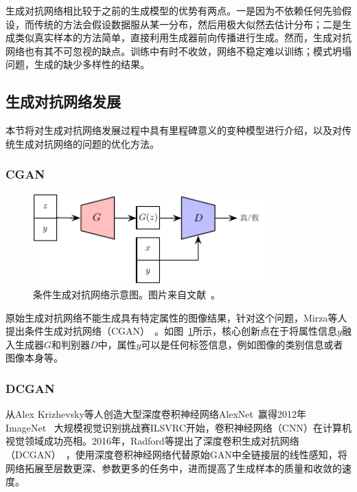 生成对抗网络相比较于之前的生成模型的优势有两点。一是因为不依赖任何先验假设，而传统的方法会假设数据服从某一分布，然后用极大似然去估计分布；二是生成类似真实样本的方法简单，直接利用生成器前向传播进行生成。然而，生成对抗网络也有其不可忽视的缺点。训练中有时不收敛，网络不稳定难以训练；模式坍塌问题，生成的缺少多样性的结果。

\subsection{生成对抗网络发展}
本节将对生成对抗网络发展过程中具有里程碑意义的变种模型进行介绍，以及对传统生成对抗网络的问题的优化方法。

\subsubsection{CGAN}

\begin{figure}[ht]
    \centering
	\includegraphics[width=0.8\textwidth]{figures/CGAN.pdf}
	\caption{条件生成对抗网络示意图。图片来自文献~\cite{mirza2014conditional}。}
	\label{fig:pic_CGAN}
\end{figure}

原始生成对抗网络不能生成具有特定属性的图像结果，针对这个问题，Mirza等人提出条件生成对抗网络（CGAN）~\citep{mirza2014conditional}。如图~\ref{fig:pic_CGAN}所示，核心创新点在于将属性信息$y$融入生成器$G$和判别器$D$中，属性$y$可以是任何标签信息，例如图像的类别信息或者图像本身等。

\subsubsection{DCGAN}
从Alex Krizhevsky等人创造大型深度卷积神经网络AlexNet~\cite{krizhevsky2017imagenet}赢得2012年ImageNet~\cite{deng2009imagenet} 大规模视觉识别挑战赛ILSVRC开始，卷积神经网络（CNN）在计算机视觉领域成功亮相。2016年，Radford等提出了深度卷积生成对抗网络（DCGAN）~\cite{radford2015unsupervised}，使用深度卷积神经网络代替原始GAN中全链接层的线性感知，将网络拓展至层数更深、参数更多的任务中，进而提高了生成样本的质量和收敛的速度。

